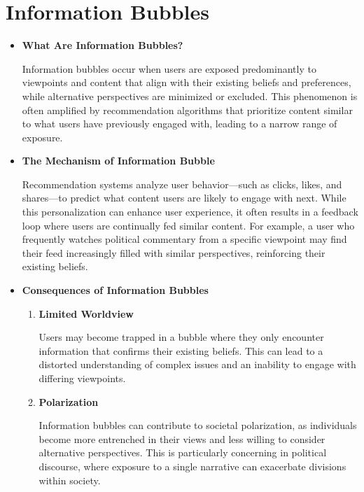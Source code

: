 \documentclass[10pt,twoside,slovak,a4paper]{article}
\begin{document}
\section{Information Bubbles} \label{Information Bubbles}
\begin{itemize}

\item \textbf{What Are Information Bubbles?} 

Information bubbles occur when users are exposed predominantly to viewpoints and content that align with their existing beliefs and preferences, while alternative perspectives are minimized or excluded\cite{boubble}. This phenomenon is often amplified by recommendation algorithms that prioritize content similar to what users have previously engaged with, leading to a narrow range of exposure.

\item \textbf{The Mechanism of Information Bubble} 

Recommendation systems analyze user behavior—such as clicks, likes, and shares—to predict what content users are likely to engage with next\cite{boubble}. While this personalization can enhance user experience, it often results in a feedback loop where users are continually fed similar content\cite{trouble}. For example, a user who frequently watches political commentary from a specific viewpoint may find their feed increasingly filled with similar perspectives, reinforcing their existing beliefs\cite{politics}.

\item \textbf{Consequences of Information Bubbles} 
\begin{enumerate}

\item \textbf{Limited Worldview}

Users may become trapped in a bubble where they only encounter information that confirms their existing beliefs\cite{trouble}. This can lead to a distorted understanding of complex issues and an inability to engage with differing viewpoints.


\item \textbf{Polarization}

Information bubbles can contribute to societal polarization, as individuals become more entrenched in their views and less willing to consider alternative perspectives\cite{politics}. This is particularly concerning in political discourse, where exposure to a single narrative can exacerbate divisions within society.


\end{enumerate}
\end{itemize}
\end{document}
